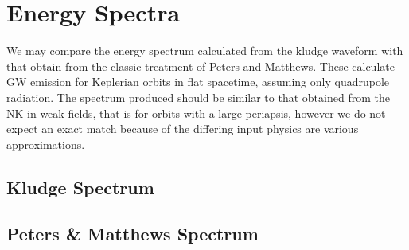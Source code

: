 \documentclass[a4paper, 11pt, titlepage, twoside]{report}
\begin{document}
{\section{Energy Spectra}

We may compare the energy spectrum calculated from the kludge waveform with that obtain from the classic treatment of Peters and Matthews\cite{Peters1963, Peters1964}. These calculate GW emission for Keplerian orbits in flat spacetime, assuming only quadrupole radiation. The spectrum produced should be similar to that obtained from the NK in weak fields, that is for orbits with a large periapsis, however we do not expect an exact match because of the differing input physics are various approximations.

\subsection{Kludge Spectrum}

\subsection{Peters \& Matthews Spectrum}

}
\end{document}
